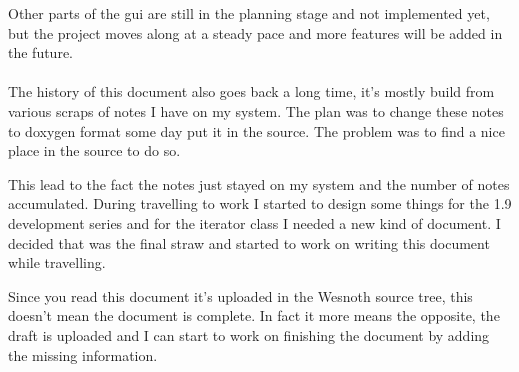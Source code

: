 Other parts of the gui are still in the planning stage and not implemented yet,
but the project moves along at a steady pace and more features will be added in
the future.

\paragraph{}

The history of this document also goes back a long time, it's mostly build from
various scraps of notes I have on my system. The plan was to change these notes
to doxygen format some day put it in the source. The problem was to find a nice
place in the source to do so.

This lead to the fact the notes just stayed on my system and the number of
notes accumulated. During travelling to work I started to design some things for
the 1.9 development series and for the iterator class I needed a new kind of
document. I decided that was the final straw and started to work on writing this
document while travelling.

Since you read this document it's uploaded in the Wesnoth source tree, this
doesn't mean the document is complete. In fact it more means the opposite, the
draft is uploaded and I can start to work on finishing the document by adding
the missing information.


